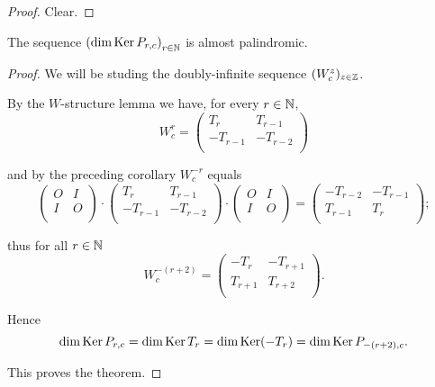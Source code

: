 \begin{proof}
  Clear.
\end{proof}

\begin{theorem}
  The sequence $\left(\dim\operatorname{Ker} P_{r,c}\right)_{r\in\mathbb{N}}$
  is almost palindromic.
\end{theorem}

\begin{proof}
  We will be studing the doubly-infinite sequence
  $(W_{c}^{z})_{z\in\mathbb{Z}}$.

  By the $W$-structure lemma we have, for every $r\in\mathbb{N}$,
  \[
  W_{c}^{r}
  =
  \left(
  \begin{array}{cc}
     T_{r} &  T_{r-1}  \\
    -T_{r-1} & -T_{r-2} \\
  \end{array}
  \right)
  \]

  and by the preceding corollary $W_{c}^{-r}$ equals
  \[
  \left(
  \begin{array}{cc}
    O & I \\
    I & O \\
  \end{array}
  \right)
  \cdot
  \left(
  \begin{array}{cc}
     T_{r} &  T_{r-1}  \\
    -T_{r-1} & -T_{r-2} \\
  \end{array}
  \right)
  \cdot
  \left(
  \begin{array}{cc}
    O & I \\
    I & O \\
  \end{array}
  \right)
  =
  \left(
  \begin{array}{cc}
    -T_{r-2}  & -T_{r-1} \\
     T_{r-1} & T_{r}     \\
  \end{array}
  \right);
  \]

  thus for all $r\in\mathbb{N}$
  \[
  W_{c}^{-(r+2)}
  =
  \left(
  \begin{array}{cc}
    -T_{r}  & -T_{r+1} \\
     T_{r+1} & T_{r+2} \\
  \end{array}
  \right).
  \]

  Hence
  \[
  \dim\operatorname{Ker} P_{r,c} =
  \dim\operatorname{Ker} T_{r} =
  \dim\operatorname{Ker}(-T_{r}) =
  \dim\operatorname{Ker} P_{-(r+2),c}.
  \]

  This proves the theorem.
\end{proof}
